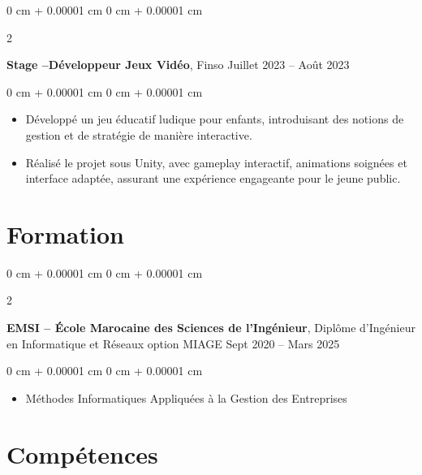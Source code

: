 \documentclass[10pt, letterpaper]{article}
\newenvironment{highlights}{
    \begin{itemize}[
        topsep=0.10 cm,
        parsep=0.10 cm,
        partopsep=0pt,
        itemsep=0pt,
        leftmargin=0 cm + 10pt
    ]
}{
    \end{itemize}
} %
\newenvironment{onecolentry}{
    \begin{adjustwidth}{
        0 cm + 0.00001 cm
    }{
        0 cm + 0.00001 cm
    }
}{
    \end{adjustwidth}
} %
\newenvironment{twocolentry}[2][]{
    \onecolentry
    \def\secondColumn{#2}
    \setcolumnwidth{\fill, 4.5 cm}
    \begin{paracol}{2}
}{
    \switchcolumn \raggedleft \secondColumn
    \end{paracol}
    \endonecolentry
} %
\begin{document}
        \vspace{0.2 cm}

        \begin{twocolentry}{
            Juillet 2023 – Août 2023
        }
            \textbf{Stage –Développeur Jeux Vidéo}, Finso\end{twocolentry}

        \vspace{0.10 cm}
        \begin{onecolentry}
            \begin{highlights}
                \item Développé un jeu éducatif ludique pour enfants, introduisant des notions de gestion et de stratégie de manière interactive.  
                \item Réalisé le projet sous Unity, avec gameplay interactif, animations soignées et interface adaptée, assurant une expérience engageante pour le jeune public.
            \end{highlights}
        \end{onecolentry}



    \section{Formation}



        
        \begin{twocolentry}{
            Sept 2020 – Mars 2025
        }
            \textbf{EMSI – École Marocaine des Sciences de l’Ingénieur}, Diplôme d’Ingénieur en Informatique et Réseaux option MIAGE \end{twocolentry}

        \vspace{0.10 cm}
        \begin{onecolentry}
            \begin{highlights}
                \item Méthodes Informatiques Appliquées à la Gestion des Entreprises 

            \end{highlights}
        \end{onecolentry}




    
   




    
    \section{Compétences}
\end{document}
